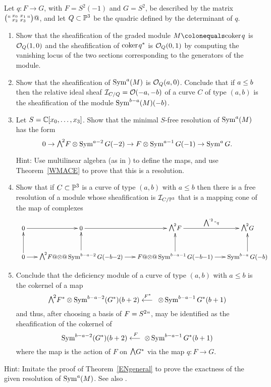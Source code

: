 \begin{exercise}
Let $q:F\to G$, with $F = S^2(-1)$ and $G = S^2$,
be described by the matrix $\bigl(` `\begin{smallmatrix} x_0&x_1\\ x_2&x_3 \end{smallmatrix}` `\bigr)@$, and let $Q\subset {\mathbb P}^3$ be the quadric defined by the determinant of $q$.
\begin{enumerate}

\item Show that the sheafification of the graded module $M \colonequals
\coker q$ is ${\mathcal O}_Q(1,0)$ and the sheafification
of ${\rm{coker}\kern1pt} q^*$ is ${\mathcal O}_Q(0,1)$ by computing the vanishing locus
of the two sections corresponding to the generators of the module.

\item Show that the sheafification of $\operatorname{Sym}^a(M)$ is
${\mathcal O}_Q(a,0)$. Conclude that
if $a\leq \nobreak b$ then the relative ideal sheaf ${\mathcal I}_{C/Q} = {\mathcal O}(-a,-b)$
of a curve $C$ of type $(a,b)$
is the sheafification of the module $\operatorname{Sym}^{b-a}(M)(-b)$.

\item Let $S = {\mathbb C}[x_0,\dots, x_3]$. Show that the minimal $S$-free
resolution of $\operatorname{Sym}^a(M)$
has the form
$$
0 \to \mwedge^2 F \otimes \Sym^{a-2} G(-2)\to F\otimes \Sym^{a-1}
G(-1)\to \Sym^a G.
$$

Hint: Use multilinear algebra (as in \cite{Eisenbud1995}) to define the
maps, and use
Theorem~\ref{WMACE} to prove that this is a resolution.

\item Show that if $C\subset {\mathbb P}^3$ is a curve of type $(a, b)$ with
$a\leq b$ then
there is a free resolution of a module
whose sheafification is ${\mathcal I}_{C/{\mathbb P}^3}$ that is a mapping cone of the
map of complexes
\vspace*{-10pt}
$$
\small
\quad
\medmuskip0mu
\xymatrix@C=15pt{
0\ar[r]  &0\ar[r]& \mwedge^2 F \ar[r]^ {\ssty\bigwedge^{`2}``q}&\mwedge^2 G\\
0\ar[r]\ar[u]  & \mwedge^2 F @\otimes@ \Sym^{b-a-2} G(-b-2) \ar[r]\ar[u]  
&F @\otimes@\Sym^{b-a-1} G(-b-1) \ar[r]\ar[u]& \Sym^{b-a} G(-b)\ar[u]
}
\vspace*{5pt}
$$

\item Conclude that the deficiency module of a curve of type $(a, b)$
with $a\leq b$ is the cokernel of a map
$$
\mwedge^2 F^* \otimes \Sym^{b-a-2} (G^*)(b+2) \luto{\,F^*}\otimes \Sym^{b-a-1}
G^*(b+1)
$$
and thus, after choosing a basis of $F = S^2` `$, may be identified as
the sheafification of the cokernel of
$$
\Sym^{b-a-2} (G^*)(b+2) \luto {\ F}\otimes \Sym^{b-a-1} G^*(b+1)
$$
where the map is the action of $F$ on $\mwedge \,G^*$ via the map $q:F\to G$.
\end{enumerate}

Hint:  Imitate the proof of Theorem~\ref{ENgeneral} to prove
the exactness of the given resolution of $\operatorname{Sym}^a(M)$. See also
\cite[Appendix A2.6]{Eisenbud1995}.
\end{exercise}

